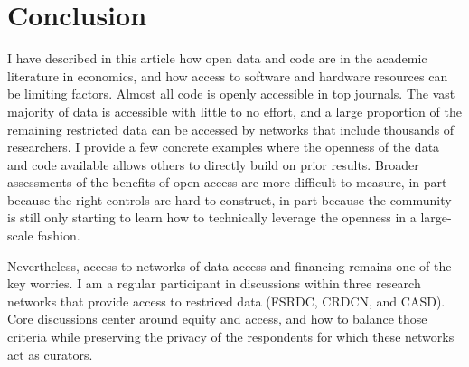 \documentclass{article}
\begin{document}
\section{Conclusion}

I have described in this article how open data and code are in the academic literature in economics, and how access to software and hardware resources can be limiting factors. Almost all code is openly accessible in top journals. The vast majority of data is accessible with little to no effort, and a large proportion of the remaining restricted data can be accessed by networks that include thousands of researchers. I provide a few concrete examples where the openness of the data and code available allows others to directly build on prior results. Broader assessments of the benefits of open access are more difficult to measure, in part because the right controls are hard to construct, in part because the community is still only starting to learn how to technically leverage the openness in a large-scale fashion.

Nevertheless, access to networks of data access and financing remains one of the key worries. I am a regular participant in discussions within three research networks that provide access to restriced data (\ac{FSRDC}, \ac{CRDCN}, and \ac{CASD}). Core discussions center around equity and access, and how to balance those criteria while preserving the privacy of the respondents for which these networks act as curators. 
\end{document}
